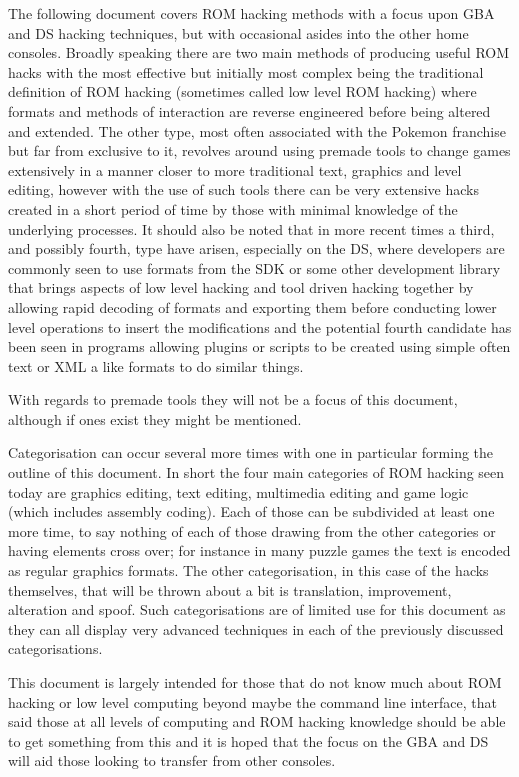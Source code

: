 \documentclass[
]{book}
\begin{document}
The following document covers ROM hacking methods with a focus upon GBA and DS hacking techniques, but with occasional asides into the other home consoles. Broadly speaking there are two main methods of producing useful ROM hacks with the most effective but initially most complex being the traditional definition of ROM hacking (sometimes called low level ROM hacking) where formats and methods of interaction are reverse engineered before being altered and extended. The other type, most often associated with the Pokemon franchise but far from exclusive to it, revolves around using premade tools to change games extensively in a manner closer to more traditional text, graphics and level editing, however with the use of such tools there can be very extensive hacks created in a short period of time by those with minimal knowledge of the underlying processes. It should also be noted that in more recent times a third, and possibly fourth, type have arisen, especially on the DS, where developers are commonly seen to use formats from the SDK or some other development library that brings aspects of low level hacking and tool driven hacking together by allowing rapid decoding of formats and exporting them before conducting lower level operations to insert the modifications and the potential fourth candidate has been seen in programs allowing plugins or scripts to be created using simple often text or XML a like formats to do similar things.

With regards to premade tools they will not be a focus of this document, although if ones exist they might be mentioned.

Categorisation can occur several more times with one in particular forming the outline of this document. In short the four main categories of ROM hacking seen today are graphics editing, text editing, multimedia editing and game logic (which includes assembly coding). Each of those can be subdivided at least one more time, to say nothing of each of those drawing from the other categories or having elements cross over; for instance in many puzzle games the text is encoded as regular graphics formats. The other categorisation, in this case of the hacks themselves, that will be thrown about a bit is translation, improvement, alteration and spoof. Such categorisations are of limited use for this document as they can all display very advanced techniques in each of the previously discussed categorisations.

This document is largely intended for those that do not know much about ROM hacking or low level computing beyond maybe the command line interface, that said those at all levels of computing and ROM hacking knowledge should be able to get something from this and it is hoped that the focus on the GBA and DS will aid those looking to transfer from other consoles.
\end{document}
